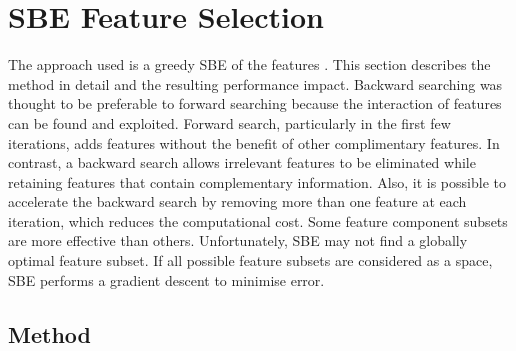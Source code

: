 \section{\acs{SBE} Feature Selection}
\label{SectionSbeFeatureSelection}

The approach used is a greedy \ac{SBE} of the features \cite{Kittler1978}. This section describes the method in detail and the resulting performance impact. 
Backward searching was thought to be preferable to forward searching because the interaction of features can be found and exploited. Forward search, particularly in the first few iterations, adds features without the benefit of other complimentary features. In contrast, a backward search allows irrelevant features to be eliminated while retaining features that contain complementary information. Also, it is possible to accelerate the backward search by removing more than one feature at each iteration, which reduces the computational cost.
Some feature component subsets are more effective than others. Unfortunately, \ac{SBE} may not find a globally optimal feature subset. If all possible feature subsets are considered as a space, \ac{SBE} performs a gradient descent to minimise error. 

\subsection{Method}

